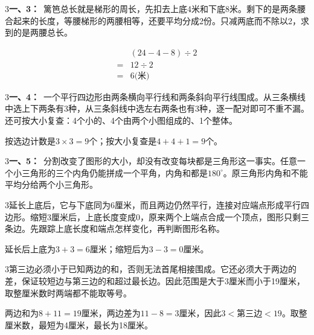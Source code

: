 \documentclass[multi=snippet,border={5bp 20bp 5bp 5bp}]{standalone}
\newenvironment{snippet}[3]{\begin{minipage}{#1bp}\color{answerred}\fontsize{#2}{#3}\selectfont\raggedright}{\end{minipage}}
\begin{document}
\begin{snippet}{505}{11.5}{14}\begin{multicols}{3}\raggedcolumns \textbf{一、3：}\ 篱笆总长就是梯形的周长，先扣去上底4米和下底8米。剩下的是两条腰合起来的长度，等腰梯形的两腰相等，还要平均分成2份。只减两底而不除以2，求到的是两腰总长。\par \[\begin{aligned}&(24-4-8)\div2\\={}&12\div2\\={}&6\text{(米)}\end{aligned}\]\end{multicols}\end{snippet}
\begin{snippet}{505}{11.5}{14}\begin{multicols}{3}\raggedcolumns \textbf{一、4：}\ 一个平行四边形由两条横向平行线和两条斜向平行线围成。从三条横线中选上下两条有3种，从三条斜线中选左右两条也有3种，逐一配对即可不重不漏。还可按大小复查：4个小的、4个由两个小图组成的、1个整体。\par 按选边计数是\(3\times3=9\)\allowbreak 个；按大小复查是\(4+4+1=9\)\allowbreak 个。\end{multicols}\end{snippet}
\begin{snippet}{505}{11.5}{14}\begin{multicols}{3}\raggedcolumns \textbf{一、5：}\ 分割改变了图形的大小，却没有改变每块都是三角形这一事实。任意一个小三角形的三个内角仍能拼成一个平角，内角和都是\(180^\circ\)\allowbreak 。原三角形内角和不能平均分给两个小三角形。\end{multicols}\end{snippet}
\begin{snippet}{505}{11.5}{14}\begin{multicols}{3}\raggedcolumns 延长上底后，它与下底同为6厘米，而且两边仍然平行，连接对应端点形成平行四边形。缩短3厘米后，上底长度变成0，原来两个上端点合成一个顶点，图形只剩三条边。先跟踪上底长度和端点怎样变化，再判断图形名称。\par 延长后上底为\(3+3=6\)\allowbreak 厘米；缩短后为\(3-3=0\)\allowbreak 厘米。\end{multicols}\end{snippet}
\begin{snippet}{505}{11.5}{14}\begin{multicols}{3}\raggedcolumns 第三边必须小于已知两边的和，否则无法首尾相接围成。它还必须大于两边的差，保证较短边与第三边的和超过最长边。因此范围是大于3厘米而小于19厘米，取整厘米数时两端都不能取等号。\par 两边和为\(8+11=19\)\allowbreak 厘米，两边差为\(11-8=3\)\allowbreak 厘米，因此\(3<\text{第三边}<19\)\allowbreak 。取整厘米数，最短为4厘米，最长为18厘米。\end{multicols}\end{snippet}
\end{document}
